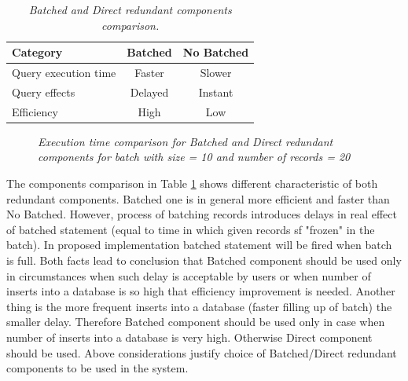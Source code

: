 \documentclass[12pt,a4paper]{article}
\begin{document}
\begin{table}[!htb]
\begin{center}
\begin{tabular}{l|c|c}
  \textbf{Category} &\textbf{Batched} & \textbf{No Batched} \\
\hline
Query execution time & Faster & Slower \\
Query effects & Delayed & Instant\\
Efficiency & High & Low\\
\end{tabular}
\end{center}
\caption{\textit{Batched and Direct redundant components comparison.}}\label{batchedcomponents}
\end{table}

\begin{figure}[!htb]
\centering
{}
\caption{\textit{Execution time comparison for Batched and Direct redundant components for batch with size = 10 and number of records = 20}} \label{fig:batchedtime}
\end{figure}

The components comparison in Table \ref{batchedcomponents} shows different characteristic of both redundant components. Batched one is in general more efficient and faster than No Batched. However, process of batching records introduces delays in real effect of batched statement (equal to time in which given records sf "frozen" in the batch). In proposed implementation batched statement will be fired when batch is full. Both facts lead to conclusion that Batched component should be used only in circumstances when such delay is acceptable by users or when number of inserts into a database is so high that efficiency improvement is needed. Another thing is the more frequent inserts into a database (faster filling up of batch) the smaller delay. Therefore Batched component should be used only in case when number of inserts into a database is very high. Otherwise Direct component should be used. Above considerations justify choice of Batched/Direct redundant components to be used in the system.   
\end{document}
